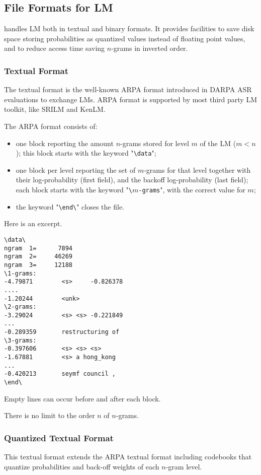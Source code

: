 \subsection{File Formats for LM}
{\IRSTLM} handles LM both in textual and binary formats.
It provides facilities to save disk space storing probabilities as quantized values instead of floating  point values, and to reduce access time saving $n$-grams in inverted order.
 
\subsubsection{Textual Format}
The textual format is the well-known ARPA format introduced in DARPA ASR evaluations  to exchange LMs.
ARPA format  is  supported by most third party LM toolkit, like SRILM and KenLM.

The ARPA format consists of:
\begin{itemize}
\item one block reporting the amount $n$-grams stored for level $m$ of the LM ($m<n$); this block starts with the keyword "{\tt \textbackslash{}data}";
\item one block per level reporting the set of $m$-grams for that level together with their log-probability (first field), and the backoff log-probability (last field); each block starts with the keyword "{\tt \textbackslash{}$m$-grams}", with the correct value for $m$;
\item the keyword  "{\tt \textbackslash{}end\textbackslash{}}" closes the file.
\end{itemize}

\noindent
Here is an excerpt.
\begin{verbatim}
\data\
ngram  1=      7894
ngram  2=     46269
ngram  3=     12188
\1-grams:
-4.79871        <s>     -0.826378
....
-1.20244        <unk>
\2-grams:
-3.29024        <s> <s> -0.221849
...
-0.289359       restructuring of
\3-grams:
-0.397606       <s> <s> <s>
-1.67881        <s> a hong_kong
...
-0.420213       seymf council ,
\end\
\end{verbatim}

\noindent
Empty lines can occur before and after each block.

\noindent
There is no limit to the order $n$ of $n$-grams.



\subsubsection{Quantized Textual Format}
This textual format extends the ARPA textual format including codebooks that quantize 
probabilities and back-off weights of each $n$-gram level.

